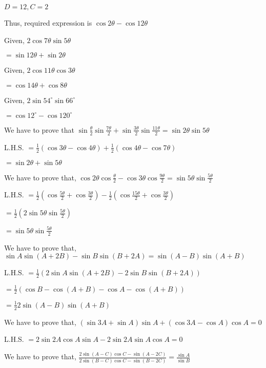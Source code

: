   $D = 12, C = 2$

  Thus, required expression is $\cos 2\theta - \cos12\theta$

\item Given, $2\cos7\theta\sin5\theta$

  $= \sin 12\theta + \sin 2\theta$

\item Given, $2\cos 11\theta\cos 3\theta$

  $= \cos 14\theta + \cos 8\theta$

\item Given, $2\sin54^\circ\sin66^\circ$

  $=\cos12^\circ - \cos120^\circ$

\item We have to prove that $\sin\frac{\theta}{2}\sin\frac{7\theta}{2} + \sin \frac{3\theta}{2}\sin\frac{11\theta}{2} =\sin
  2\theta\sin 5\theta$

  L.H.S. $= \frac{1}{2}(\cos 3\theta - \cos 4\theta) + \frac{1}{2}(\cos 4\theta - \cos 7\theta)$

  $= \sin2\theta + \sin5\theta$

\item We have to prove that, $\cos 2\theta\cos \frac{\theta}{2} -\cos3\theta\cos\frac{9\theta}{2} =
  \sin5\theta\sin\frac{5\theta}{2}$

  L.H.S. $= \frac{1}{2}\left(\cos\frac{5\theta}{2} + \cos \frac{3\theta}{2}\right) - \frac{1}{2}\left(\cos
  \frac{15\theta}{2} + \cos \frac{3\theta}{2}\right)$

  $= \frac{1}{2}\left(2\sin 5\theta \sin \frac{5\theta}{2}\right)$

  $= \sin5\theta\sin\frac{5\theta}{2}$

\item We have to prove that, $\sin A\sin(A + 2B) - \sin B\sin(B + 2A) = \sin(A - B)\sin(A + B)$

  L.H.S. $= \frac{1}{2}(2\sin A\sin(A + 2B) - 2\sin B\sin(B + 2A))$

  $= \frac{1}{2}(\cos B - \cos(A + B) - \cos A - \cos (A + B))$

  $= \frac{1}{2}2\sin(A - B)\sin(A + B)$

\item We have to prove that, $(\sin 3A + \sin A)\sin A + (\cos 3A - \cos A)\cos A = 0$

  L.H.S. $= 2\sin2A\cos A\sin A - 2\sin2A\sin A\cos A = 0$

\item We have to prove that, $\frac{2\sin(A - C)\cos C - \sin(A - 2C)}{2\sin(B - C)\cos C - \sin(B - 2C)} = \frac{\sin A}{\sin
  B}$

